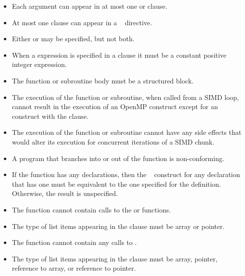 \restrictions
\begin{itemize}
\item Each argument can appear in at most one  or  clause.

\item At most one  clause can appear in a ~ directive.

\item Either  or  may be specified, but not both.

\item When a  expression is specified in a  clause it must be a 
constant positive integer expression.

\item The function or subroutine body must be a structured block.

\item The execution of the function or subroutine, when called from a SIMD loop, cannot result in the execution of an OpenMP construct except for an  construct with the  clause. 

\item The execution of the function or subroutine cannot have any side effects that would 
alter its execution for concurrent iterations of a SIMD chunk.

\item A program that branches into or out of the function is non-conforming.

\ccppspecificstart
\item If the function has any declarations, then the ~ construct for any 
declaration that has one must be equivalent to the one specified for the definition. 
Otherwise, the result is unspecified.

\item The function cannot contain calls to the  or  functions. 
\ccppspecificend

\cspecificstart
\item The type of list items appearing in the  clause must be array or pointer. 
\cspecificend

\cppspecificstart
\item The function cannot contain any calls to . 

\item The type of list items appearing in the  clause must be array, pointer, 
reference to array, or reference to pointer.
\cppspecificend


\end{itemize}
